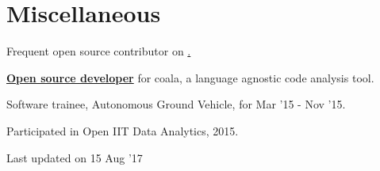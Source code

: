 \documentclass[a4paper]{deedy-resume} %
\newcommand{\newlink}[2]{
  \href{#1}{\color{black}#2}
}
\begin{document}
\begin{minipage}[t]{0.69\textwidth}
  \sectionspace
  \section{Miscellaneous}
  \vspace{\topsep}
  \begin{tightitemize}
  	\item Frequent open source contributor on \href{https://github.com/kaustubhhiware}{.}
  	\item \newlink{https://github.com/orgs/coala/teams/coala-developers/members?&query=kaustubh}{\bf{Open source developer}} for coala, a language agnostic code analysis tool.
  	\item Software trainee, Autonomous Ground Vehicle, for Mar '15 - Nov '15.
  	\item Participated in Open IIT Data Analytics, 2015.
  \end{tightitemize}

  \sectionspace

\end{minipage}

	\begin{flushright}
	\footnotesize Last updated on 15 Aug '17
	\end{flushright}
\end{document}
